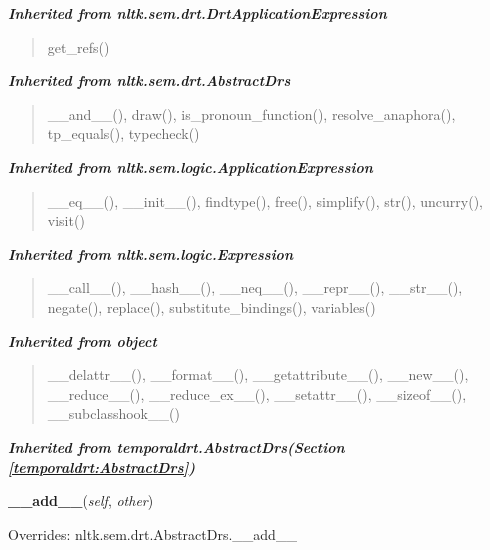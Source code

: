 \large{\textbf{\textit{Inherited from nltk.sem.drt.DrtApplicationExpression}}}

\begin{quote}
get\_refs()
\end{quote}

\large{\textbf{\textit{Inherited from nltk.sem.drt.AbstractDrs}}}

\begin{quote}
\_\_and\_\_(), draw(), is\_pronoun\_function(), resolve\_anaphora(), tp\_equals(), typecheck()
\end{quote}

\large{\textbf{\textit{Inherited from nltk.sem.logic.ApplicationExpression}}}

\begin{quote}
\_\_eq\_\_(), \_\_init\_\_(), findtype(), free(), simplify(), str(), uncurry(), visit()
\end{quote}

\large{\textbf{\textit{Inherited from nltk.sem.logic.Expression}}}

\begin{quote}
\_\_call\_\_(), \_\_hash\_\_(), \_\_neq\_\_(), \_\_repr\_\_(), \_\_str\_\_(), negate(), replace(), substitute\_bindings(), variables()
\end{quote}

\large{\textbf{\textit{Inherited from object}}}

\begin{quote}
\_\_delattr\_\_(), \_\_format\_\_(), \_\_getattribute\_\_(), \_\_new\_\_(), \_\_reduce\_\_(), \_\_reduce\_ex\_\_(), \_\_setattr\_\_(), \_\_sizeof\_\_(), \_\_subclasshook\_\_()
\end{quote}

\large{\textbf{\textit{Inherited from temporaldrt.AbstractDrs\textit{(Section \ref{temporaldrt:AbstractDrs})}}}}

    \vspace{0.5ex}

\hspace{.8\funcindent}\begin{boxedminipage}{\funcwidth}

    \raggedright \textbf{\_\_add\_\_}(\textit{self}, \textit{other})

\setlength{\parskip}{2ex}
\setlength{\parskip}{1ex}
      Overrides: nltk.sem.drt.AbstractDrs.\_\_add\_\_

    \end{boxedminipage}

    \vspace{0.5ex}

